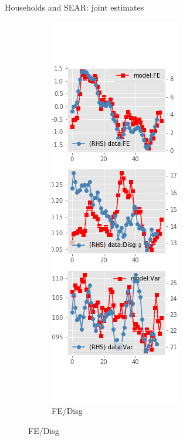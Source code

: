 \documentclass{beamer}
\begin{document}
\begin{frame}{Households and SEAR: joint estimates}
\begin{figure}[ht]
\begin{subfigure}[b]{0.2\textwidth}
		\end{subfigure}
		\hfill
		\begin{subfigure}[b]{0.2\textwidth}
			\caption{FE/Disg}
			\includegraphics[width=\textwidth, height = 0.8\textheight]{figuresDraft/sce_se_est_diag2.png}
		\end{subfigure}
	\end{figure}
\end{frame}
\end{document}
